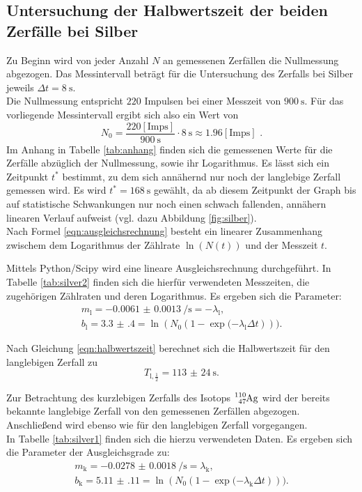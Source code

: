 \subsection{Untersuchung der Halbwertszeit der beiden Zerfälle bei Silber}
Zu Beginn wird von jeder Anzahl $N$ an gemessenen Zerfällen die Nullmessung abgezogen.
Das Messintervall beträgt für die Untersuchung des Zerfalls bei Silber jeweils $\Delta t = \SI{8}{\second}$.\\
Die Nullmessung entspricht $220$ Impulsen bei einer Messzeit von $\SI{900}{\second}$.
Für das vorliegende Messintervall ergibt sich also ein Wert von
\begin{equation*}
	N_0=\frac{220\mathrm{ [Imps]}}{\SI{900}{\second}}\cdot \SI{8}{\second}\approx 1.96\mathrm{ [Imps]}\text{ .}
\end{equation*}
Im Anhang in Tabelle \ref{tab:anhang} finden sich die gemessenen Werte für die Zerfälle abzüglich der Nullmessung, sowie ihr Logarithmus.
Es lässt sich ein Zeitpunkt $t^{*}$ bestimmt, zu dem sich annähernd nur noch der langlebige Zerfall gemessen wird.
Es wird $t^{*}=\SI{168}{\second}$ gewählt, da ab diesem Zeitpunkt der Graph bis auf statistische Schwankungen nur noch einen schwach fallenden, annähern linearen Verlauf aufweist (vgl. dazu Abbildung \ref{fig:silber}).\\
Nach Formel \eqref{eqn:ausgleichsrechnung} besteht ein linearer Zusammenhang zwischem dem Logarithmus der Zählrate $\ln{(N(t))}$ und der Messzeit $t$.

Mittels Python/Scipy \cite{scipy} wird eine lineare Ausgleichsrechnung durchgeführt.
In Tabelle \ref{tab:silver2} finden sich die hierfür verwendeten Messzeiten, die zugehörigen Zählraten und deren Logarithmus.
Es ergeben sich die Parameter:
\begin{gather*}
	m_{\mathrm{l}}= \SI{-0.0061(13)}{\per\second}=-\lambda_\mathrm{l}\text{,}\\
	b_{\mathrm{l}}=\num{3.3(4)}=\ln{(N_0 \left(1- \exp{(-\lambda_\mathrm{l} \Delta t}\right)))}\text{.}
\end{gather*}

Nach Gleichung \eqref{eqn:halbwertszeit} berechnet sich die Halbwertszeit für den langlebigen Zerfall zu
\begin{equation}
	T_{\mathrm{l},\frac{1}{2}}=\SI{113(24)}{\second}\text{.}
\end{equation}


Zur Betrachtung des kurzlebigen Zerfalls des Isotops $\ce{^{110}_47Ag}$ wird der bereits bekannte langlebige Zerfall von den gemessenen Zerfällen abgezogen.
Anschließend wird ebenso wie für den langlebigen Zerfall vorgegangen.\\
In Tabelle \ref{tab:silver1} finden sich die hierzu verwendeten Daten.
Es ergeben sich die Parameter der Ausgleichsgrade zu:
\begin{align*}
	m_{\mathrm{k}}= \SI{-0.0278(18)}{\per\second}=\lambda_\mathrm{k}\text{,}\\
	b_{\mathrm{k}}=\num{5.11(11)}=\ln{(N_0 \left(1- \exp{(-\lambda_\mathrm{k} \Delta t}\right)))}\text{.}
\end{align*}

